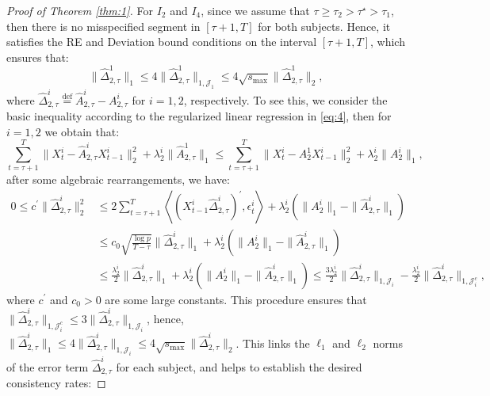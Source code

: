 \documentclass[11pt]{article}
\begin{document}
\begin{proof}[Proof of Theorem \ref{thm:1}]
For $I_2$ and $I_4$, since we assume that $\tau \geq \tau_2 > \tau^\star > \tau_1$, then there is no misspecified segment in $[\tau+1, T]$ for both subjects. Hence, it satisfies the RE and Deviation bound conditions on the interval $[\tau+1, T]$, which ensures that:
\begin{equation*}
    \|\widehat{\Delta}_{2,\tau}^1\|_1 \leq 4\|\widehat{\Delta}_{2,\tau}^1\|_{1,\mathcal{J}_1} \leq 4\sqrt{s_{\max}}\|\widehat{\Delta}_{2,\tau}^1\|_2,
\end{equation*}
where $\widehat{\Delta}_{2,\tau}^i \overset{\text{def}}{=} \widehat{A}_{2,\tau}^i - A_{2,\tau}^i$ for $i=1,2$, respectively. To see this, we consider the basic inequality according to the regularized linear regression in \eqref{eq:4}, then for $i=1,2$ we obtain that:
\begin{equation*}
    \sum_{t=\tau+1}^T \|X_t^i - \widehat{A}_{2,\tau}^iX_{t-1}^i\|_2^2 + \lambda_2^i\|\widehat{A}_{2,\tau}^1\|_1 \leq \sum_{t=\tau+1}^T \|X_t^i - A_2^1X_{t-1}^i\|_2^2 + \lambda_2^i\|A_2^i\|_1,
\end{equation*}
after some algebraic rearrangements, we have:
\begin{equation*}
    \begin{aligned}
        0 \leq c^\prime\|\widehat{\Delta}_{2,\tau}^i\|_2^2 
        &\leq 2\sum_{t=\tau+1}^T\left\langle (X_{t-1}^i\widehat{\Delta}_{2,\tau}^i)^\prime, \epsilon_t^i \right\rangle + \lambda_2^i\left(\|A_2^i\|_1 - \|\widehat{A}_{2,\tau}^i\|_1\right) \\
        &\leq c_0\sqrt{\frac{\log p}{T-\tau}}\|\widehat{\Delta}_{2,\tau}^i\|_1 + \lambda_2^i\left(\|A_2^i\|_1 - \|\widehat{A}_{2,\tau}^i\|_1\right) \\
        &\leq \frac{\lambda_2^i}{2}\|\widehat{\Delta}_{2,\tau}^i\|_1 + \lambda_2^i\left(\|A_2^i\|_1 - \|\widehat{A}_{2,\tau}^i\|_1\right) \leq \frac{3\lambda_2^i}{2}\|\widehat{\Delta}_{2,\tau}^i\|_{1,\mathcal{J}_i} - \frac{\lambda_2^i}{2}\|\widehat{\Delta}_{2,\tau}^i\|_{1,\mathcal{J}_i^c},
    \end{aligned}
\end{equation*}
where $c^\prime$ and $c_0>0$ are some large constants. This procedure ensures that $\|\widehat{\Delta}_{2,\tau}^i\|_{1,\mathcal{J}_i^c} \leq 3\|\widehat{\Delta}_{2,\tau}^i\|_{1,\mathcal{J}_i}$, hence, $\|\widehat{\Delta}_{2,\tau}^i\|_1 \leq 4\|\widehat{\Delta}_{2,\tau}^i\|_{1,\mathcal{J}_i} \leq 4\sqrt{s_{\max}}\|\widehat{\Delta}_{2,\tau}^i\|_2$. This links the $\ell_1$ and $\ell_2$ norms of the error term $\widehat{\Delta}_{2,\tau}^i$ for each subject, and helps to establish the desired consistency rates:

\end{proof}
\end{document}
